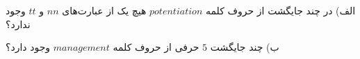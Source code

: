 \EXERCISE
الف) در چند جایگشت از حروف کلمه
$potentiation$
هیچ یک از عبارت‌های
$nn$
و
$tt$
وجود ندارد؟

ب) چند جایگشت
$5$
حرفی از حروف کلمه
$management$
وجود دارد؟